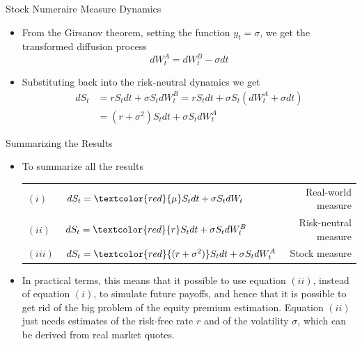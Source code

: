 \documentclass{beamer}
\begin{document}
\begin{frame}{Stock Numeraire Measure Dynamics}
  \begin{itemize}
  \item From the Girsanov theorem, setting the function $y_t = \sigma$, we get the transformed diffusion process
    \begin{equation*}
      dW_t^A = dW_t^B - \sigma dt 
    \end{equation*}
  \item Substituting back into the risk-neutral dynamics we get
    \begin{equation*}
      \begin{aligned}
	dS_t &= r S_t dt + \sigma S_t dW_t^B = 
	rS_t dt + \sigma S_t (dW_t^A + \sigma dt) \\
	& = (r + \sigma^2)S_t dt + \sigma S_t dW^A_t
      \end{aligned}
    \end{equation*}
  \end{itemize}
\end{frame}

\begin{frame}{Summarizing the Results}
  \begin{itemize}
  \item<1-> To summarize all the results
    \vspace{0.5cm}
    \begin{table}
      \begin{tabular}{llr}
	$(i)$&$dS_t = \textcolor{red}{\mu} S_t dt + \sigma S_t dW_t$ & Real-world measure \\
	$(ii)$&$dS_t = \textcolor{red}{r}S_t dt + \sigma S_t dW_t^B$ & Risk-neutral measure \\
	$(iii)$&$dS_t = \textcolor{red}{(r + \sigma^2)}S_t dt + \sigma S_t dW^A_t$ & Stock measure\\
      \end{tabular}
    \end{table}
    \vspace{0.5cm}
  \item<2-> In practical terms, this means that it possible to use equation $(ii)$, instead of equation $(i)$, to simulate future payoffs, and hence that it is possible to get rid of the big problem of the equity premium estimation. Equation $(ii)$ just needs estimates of the risk-free rate $r$ and of the volatility $\sigma$, which can be derived from real market quotes.
  \end{itemize}
	\pause
\end{frame}
\end{document}
